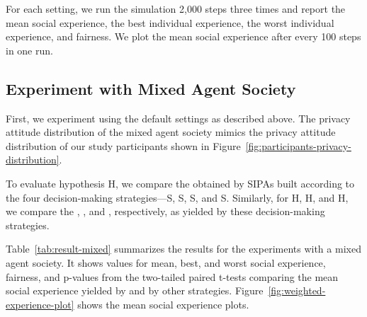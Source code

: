 
For each setting, we run the simulation 2,000 steps three times and report the mean social experience, the best individual experience, the worst individual experience, and fairness. We plot the mean social experience after every 100 steps in one run. 

\subsection{Experiment with Mixed Agent Society}

First, we experiment using the default settings as described above. The privacy attitude distribution of the mixed agent society mimics the privacy attitude distribution of our study participants  shown in Figure~\ref{fig:participants-privacy-distribution}.

To evaluate hypothesis H, we compare the  obtained by SIPAs built according to the four decision-making strategies---S\fsub{\frameworkAinur}, S, S, and S. Similarly, for H, H, and H, we compare the , , and , respectively, as yielded by these decision-making strategies. 

Table~\ref{tab:result-mixed} summarizes the results for the experiments with a mixed agent society.  It shows values for mean, best, and worst social experience, fairness, and p-values from the two-tailed paired t-tests comparing the mean social experience yielded by \frameworkAinur and by other strategies. Figure~\ref{fig:weighted-experience-plot} shows the mean social experience plots. 


